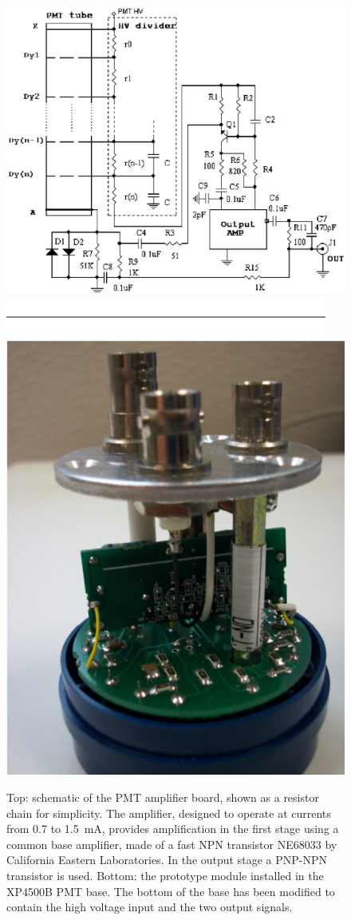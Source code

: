 \begin{figure}
	\centering
	\includegraphics[width=1.0\columnwidth, keepaspectratio]{img/dividerSchematic.png}
	\includegraphics[width=0.99\columnwidth, keepaspectratio]{img/blank.png}
	\includegraphics[width=0.62\columnwidth, height=0.8\columnwidth]{img/pmtWithDivider.png}
	\caption{Top: schematic of the PMT amplifier board, shown as a resistor chain for simplicity. The amplifier,
          designed to operate at currents from 0.7 to 1.5~mA, provides amplification in the first stage using a common
          base amplifier, made of a fast NPN transistor NE68033 by California Eastern Laboratories. In the output
          stage a PNP-NPN transistor is used. Bottom: the prototype module installed in the XP4500B PMT base. The
          bottom of the base has been modified to contain the high voltage input and the two output signals.}
	\label{fig:pmtWithDivider}
\end{figure}

